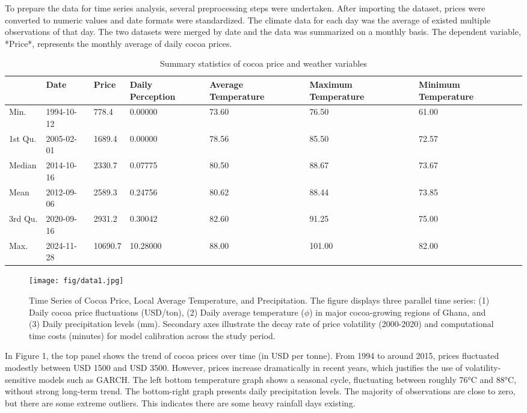 \documentclass[10pt]{article}
\begin{document}
\noindent
To prepare the data for time series analysis, several preprocessing steps were undertaken. After importing the dataset, prices were converted to numeric values and date formats were standardized. The climate data for each day was the average of existed multiple observations of that day. The two datasets were merged by date and the data was summarized on a monthly basis. The dependent variable, *Price*, represents the monthly average of daily cocoa prices.

\begin{table}[htbp]
\centering
\begin{tabular}{p{2cm}p{2cm}p{2cm}p{2cm}p{2cm}p{2cm}p{2cm}}
\toprule
 & Date & Price & Daily Perception & Average Temperature & Maximum Temperature & Minimum Temperature \\
\midrule
Min. & 1994-10-12 & 778.4 & 0.00000 & 73.60 & 76.50 & 61.00 \\
1st Qu. & 2005-02-01 & 1689.4 & 0.00000 & 78.56 & 85.50 & 72.57 \\
Median & 2014-10-16 & 2330.7 & 0.07775 & 80.50 & 88.67 & 73.67 \\
Mean & 2012-09-06 & 2589.3 & 0.24756 & 80.62 & 88.44 & 73.85 \\
3rd Qu. & 2020-09-16 & 2931.2 & 0.30042 & 82.60 & 91.25 & 75.00 \\
Max. & 2024-11-28 & 10690.7 & 10.28000 & 88.00 & 101.00 & 82.00 \\
\bottomrule
\end{tabular}
\caption{Summary statistics of cocoa price and weather variables}
\end{table}

\begin{figure}[ht]
    \centering
    \captionsetup{font=scriptsize}
    \texttt{[image: fig/data1.jpg]}
    \caption{\scriptsize Time Series of Cocoa Price, Local Average Temperature, and Precipitation. The figure displays three parallel time series: (1) Daily cocoa price fluctuations (USD/ton), (2) Daily average temperature ($\phi$) in major cocoa-growing regions of Ghana, and (3) Daily precipitation levels (mm). Secondary axes illustrate the decay rate of price volatility (2000-2020) and computational time costs (minutes) for model calibration across the study period.}
    \label{fig:enter-label}
\end{figure}
\noindent
In Figure 1, the top panel shows the trend of cocoa prices over time (in USD per tonne). From 1994 to around 2015, prices fluctuated modestly between USD 1500 and USD 3500. However, prices increase dramatically in recent years, which justifies the use of volatility-sensitive models such as GARCH. The left bottom temperature graph shows a seasonal cycle, fluctuating between roughly 76°C and 88°C, without strong long-term trend. The bottom-right graph presents daily precipitation levels. The majority of observations are close to zero, but there are some extreme outliers. This indicates there are some heavy rainfall days existing. 
\end{document}
